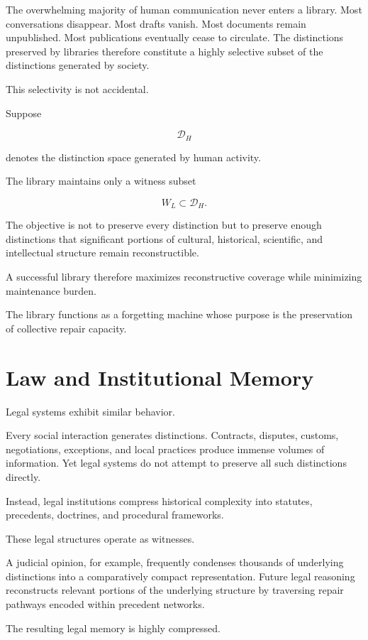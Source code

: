 \documentclass[12pt,oneside]{book}
\theoremstyle{plain} \newtheorem{theorem}{Theorem}[chapter] \newtheorem{lemma}[theorem]{Lemma} \newtheorem{proposition}[theorem]{Proposition} \newtheorem{corollary}[theorem]{Corollary}
\theoremstyle{definition} \newtheorem{definition}[theorem]{Definition} \newtheorem{axiom}[theorem]{Axiom} \newtheorem{construction}[theorem]{Construction}
\theoremstyle{remark} \newtheorem{remark}[theorem]{Remark} \newtheorem{example}[theorem]{Example}
\newcommand{\D}{\mathcal{D}} \newcommand{\R}{\mathcal{R}} \newcommand{\F}{\mathcal{F}} \newcommand{\U}{\mathcal{U}} \newcommand{\M}{\mathcal{M}} \newcommand{\G}{\Gamma}
\begin{document}
The overwhelming majority of human communication never enters a library. Most conversations disappear. Most drafts vanish. Most documents remain unpublished. Most publications eventually cease to circulate. The distinctions preserved by libraries therefore constitute a highly selective subset of the distinctions generated by society.

This selectivity is not accidental.

Suppose

\[
\D_H
\]

denotes the distinction space generated by human activity.

The library maintains only a witness subset

\[
W_L
\subset
\D_H.
\]

The objective is not to preserve every distinction but to preserve enough distinctions that significant portions of cultural, historical, scientific, and intellectual structure remain reconstructible.

A successful library therefore maximizes reconstructive coverage while minimizing maintenance burden.

The library functions as a forgetting machine whose purpose is the preservation of collective repair capacity.

\section{Law and Institutional Memory}

Legal systems exhibit similar behavior.

Every social interaction generates distinctions. Contracts, disputes, customs, negotiations, exceptions, and local practices produce immense volumes of information. Yet legal systems do not attempt to preserve all such distinctions directly.

Instead, legal institutions compress historical complexity into statutes, precedents, doctrines, and procedural frameworks.

These legal structures operate as witnesses.

A judicial opinion, for example, frequently condenses thousands of underlying distinctions into a comparatively compact representation. Future legal reasoning reconstructs relevant portions of the underlying structure by traversing repair pathways encoded within precedent networks.

The resulting legal memory is highly compressed.
\end{document}
